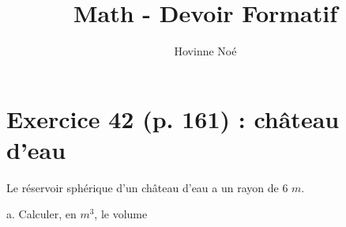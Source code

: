 \documentclass[10pt]{article}
\begin{document}
\title{Math - Devoir Formatif}
\author{Hovinne Noé}
\date{}
\maketitle
\section*{Exercice 42 (p. 161) : château d'eau}\vspace{0.2cm}

\flushleft Le réservoir sphérique d'un château d'eau a un rayon de 6 $m$.

a. Calculer, en $m^3$, le volume 
\end{document}
